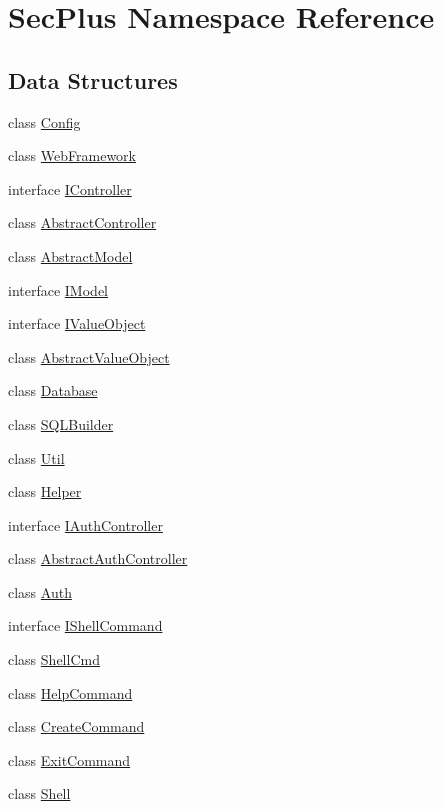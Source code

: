 \hypertarget{namespace_sec_plus}{
\section{SecPlus Namespace Reference}
\label{namespace_sec_plus}
}
\subsection*{Data Structures}
\begin{DoxyCompactItemize}
\item 
class \hyperlink{class_sec_plus_1_1_config}{Config}
\item 
class \hyperlink{class_sec_plus_1_1_web_framework}{WebFramework}
\item 
interface \hyperlink{interface_sec_plus_1_1_i_controller}{IController}
\item 
class \hyperlink{class_sec_plus_1_1_abstract_controller}{AbstractController}
\item 
class \hyperlink{class_sec_plus_1_1_abstract_model}{AbstractModel}
\item 
interface \hyperlink{interface_sec_plus_1_1_i_model}{IModel}
\item 
interface \hyperlink{interface_sec_plus_1_1_i_value_object}{IValueObject}
\item 
class \hyperlink{class_sec_plus_1_1_abstract_value_object}{AbstractValueObject}
\item 
class \hyperlink{class_sec_plus_1_1_database}{Database}
\item 
class \hyperlink{class_sec_plus_1_1_s_q_l_builder}{SQLBuilder}
\item 
class \hyperlink{class_sec_plus_1_1_util}{Util}
\item 
class \hyperlink{class_sec_plus_1_1_helper}{Helper}
\item 
interface \hyperlink{interface_sec_plus_1_1_i_auth_controller}{IAuthController}
\item 
class \hyperlink{class_sec_plus_1_1_abstract_auth_controller}{AbstractAuthController}
\item 
class \hyperlink{class_sec_plus_1_1_auth}{Auth}
\item 
interface \hyperlink{interface_sec_plus_1_1_i_shell_command}{IShellCommand}
\item 
class \hyperlink{class_sec_plus_1_1_shell_cmd}{ShellCmd}
\item 
class \hyperlink{class_sec_plus_1_1_help_command}{HelpCommand}
\item 
class \hyperlink{class_sec_plus_1_1_create_command}{CreateCommand}
\item 
class \hyperlink{class_sec_plus_1_1_exit_command}{ExitCommand}
\item 
class \hyperlink{class_sec_plus_1_1_shell}{Shell}
\end{DoxyCompactItemize}
